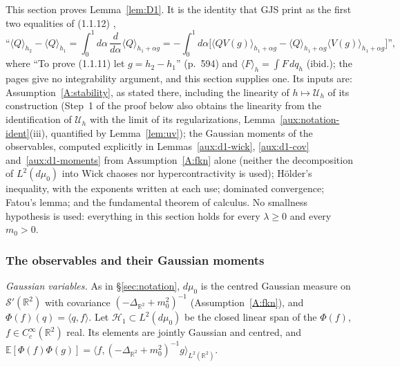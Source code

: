 \documentclass[11pt,a4paper]{article}
\theoremstyle{plain}
\theoremstyle{definition}
\theoremstyle{plain}
\theoremstyle{definition}
\newcommand{\R}{\mathbb{R}}
\newcommand{\E}{\mathbb{E}}
\newcommand{\ip}[2]{\langle #1,#2\rangle}
\newcommand{\Uc}{\mathcal U}
\newcommand{\dmu}{d\mu_0}
\begin{document}
This section proves Lemma~\ref{lem:D1}. It is the identity that GJS print as the first two
equalities of (1.1.12) \cite[p.~595]{GJS},
\[
 \text{``}\langle Q\rangle_{h_2}-\langle Q\rangle_{h_1}
 =\int_0^1d\alpha\,\frac{d}{d\alpha}\langle Q\rangle_{h_1+\alpha g}
 =-\int_0^1d\alpha\bigl[\langle QV(g)\rangle_{h_1+\alpha g}
 -\langle Q\rangle_{h_1+\alpha g}\langle V(g)\rangle_{h_1+\alpha g}\bigr]\text{''},
\]
where ``To prove (1.1.11) let $g=h_2-h_1$'' (p.~594) and $\langle F\rangle_h=\int F\,dq_h$
(ibid.); the pages give no integrability argument, and this section supplies one. Its inputs
are: Assumption~\ref{A:stability}, as stated there, including the linearity of
$h\mapsto\Uc_h$ of its construction (Step~1 of the proof below also obtains the linearity
from the identification of $\Uc_h$ with the limit of its regularizations,
Lemma~\ref{aux:notation-ident}(iii), quantified by Lemma~\ref{lem:uv}); the Gaussian moments
of the observables, computed explicitly in Lemmas~\ref{aux:d1-wick}, \ref{aux:d1-cov}
and~\ref{aux:d1-moments} from Assumption~\ref{A:fkn} alone (neither the decomposition of
$L^2(\dmu)$ into Wick chaoses nor
hypercontractivity is used); H\"older's inequality, with the exponents written at each use;
dominated convergence; Fatou's lemma; and the fundamental theorem of calculus. No smallness
hypothesis is used: everything in this section holds for every $\lambda\ge0$ and every
$m_0>0$.

\subsubsection*{The observables and their Gaussian moments}

\emph{Gaussian variables.} As in \S\ref{sec:notation}, $\dmu$ is the centred Gaussian measure
on $\mathcal S'(\R^2)$ with covariance $(-\Delta_{\R^2}+m_0^2)^{-1}$ (Assumption~\ref{A:fkn}),
and $\Phi(f)(q)=\langle q,f\rangle$. Let $\mathscr H_1\subset
L^2(\dmu)$ be the closed linear span of the $\Phi(f)$, $f\in C_c^\infty(\R^2)$ real. Its
elements are jointly Gaussian and centred, and
$\E[\Phi(f)\Phi(g)]=\ip{f}{(-\Delta_{\R^2}+m_0^2)^{-1}g}_{L^2(\R^2)}$.
\end{document}
